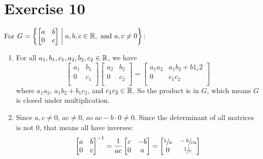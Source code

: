 \documentclass[12pt]{article}
\begin{document}
    \section*{Exercise 10}
    For $G = \left\{ \begin{bmatrix} a & b \\ 0 & c \end{bmatrix} \;
    \middle\vert \; a, b, c \in \mathbb{R}, \text{ and } a, c \neq 0 \right\}$:
    \begin{enumerate}[label=\textbf{\alph*.}]
        \item 
            For all $a_1, b_1, c_1, a_2, b_2, c_2 \in \mathbb{R}$, we have
            \[ \begin{bmatrix}
            a_1 & b_1 \\
            0 & c_1 \\
            \end{bmatrix}
            \begin{bmatrix}
            a_2 & b_2 \\
            0 & c_2 \\
            \end{bmatrix}
            = \begin{bmatrix}
            a_1a_2 & a_1b_2 + b1_c2 \\
            0 & c_1c_2 \\
            \end{bmatrix} \]
            where $a_1a_2$, $a_1b_2 + b_1c_2$, and $c_1c_2 \in \mathbb{R}$.
            So the product is in $G$,
            which means $G$ is closed under multiplication.
        \item
            Since $a, c \neq 0$, $ac \neq 0$,
            so $ac - b \cdot 0 \neq 0$.
            Since the determinant of all matrices is not 0, that means all
            have inverses:
            \[ \begin{bmatrix}
            a & b \\
            0 & c \\
            \end{bmatrix}^{-1}
            = \dfrac{1}{ac}\begin{bmatrix}
            c & -b \\
            0 & a \\
            \end{bmatrix}
            = \begin{bmatrix}
            \sfrac{1}{a} & \sfrac{-b}{ca} \\
            0 & \sfrac{1}{c} \\

\end{bmatrix}\]
\end{enumerate}
\end{document}

